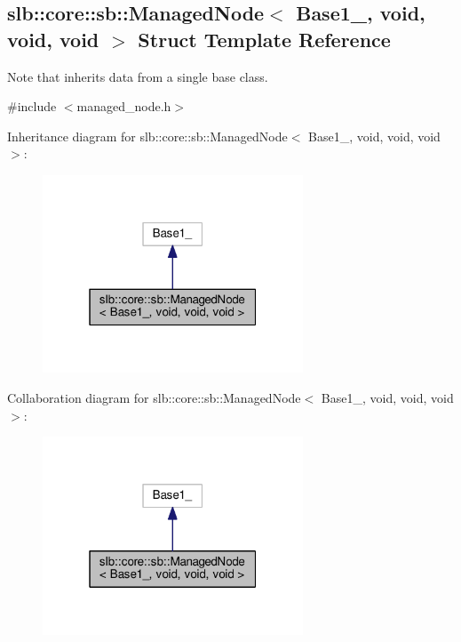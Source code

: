 \hypertarget{structslb_1_1core_1_1sb_1_1ManagedNode_3_01Base1___00_01void_00_01void_00_01void_01_4}{}\subsection{slb\+:\+:core\+:\+:sb\+:\+:Managed\+Node$<$ Base1\+\_\+, void, void, void $>$ Struct Template Reference}
\label{structslb_1_1core_1_1sb_1_1ManagedNode_3_01Base1___00_01void_00_01void_00_01void_01_4}


Note that inherits data from a single base class.  




{\ttfamily \#include $<$managed\+\_\+node.\+h$>$}



Inheritance diagram for slb\+:\+:core\+:\+:sb\+:\+:Managed\+Node$<$ Base1\+\_\+, void, void, void $>$\+:\nopagebreak
\begin{figure}[H]
\begin{center}
\leavevmode
\includegraphics[width=220pt]{structslb_1_1core_1_1sb_1_1ManagedNode_3_01Base1___00_01void_00_01void_00_01void_01_4__inherit__graph}
\end{center}
\end{figure}


Collaboration diagram for slb\+:\+:core\+:\+:sb\+:\+:Managed\+Node$<$ Base1\+\_\+, void, void, void $>$\+:\nopagebreak
\begin{figure}[H]
\begin{center}
\leavevmode
\includegraphics[width=220pt]{structslb_1_1core_1_1sb_1_1ManagedNode_3_01Base1___00_01void_00_01void_00_01void_01_4__coll__graph}
\end{center}
\end{figure}
